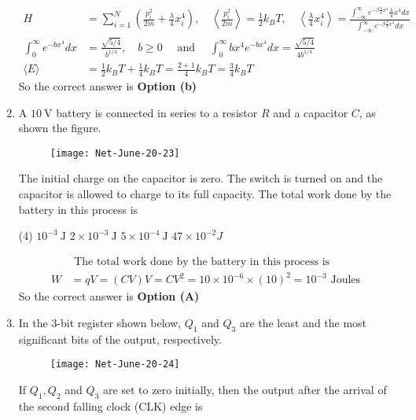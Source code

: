 \begin{enumerate}
\begin{answer}
\begin{align*}
	H&=\sum_{i=1}^{N}\left(\frac{p_{i}^{2}}{2 m}+\frac{\lambda}{4} x_{i}^{4}\right), \quad\left\langle\frac{p_{i}^{2}}{2 m}\right\rangle=\frac{1}{2} k_{B} T, \quad\left\langle\frac{\lambda}{4} x_{i}^{4}\right\rangle=\frac{\int_{-\infty}^{\infty} e^{-\beta \frac{\lambda}{4} x^{4}} \frac{\lambda}{4} x^{4} d x}{\int_{-\infty}^{\infty} e^{-\beta \frac{\lambda}{4} x^{4}} d x}\\
	\int_{0}^{\infty} e^{-b x^{4}} d x&=\frac{\sqrt{5 / 4}}{b^{1 / 4}}, \quad b \geq 0 \quad \text { and } \quad \int_{0}^{\infty} b x^{4} e^{-b x^{4}} d x=\frac{\sqrt{5 / 4}}{4 b^{1 / 4}}\\
	\langle E\rangle&=\frac{1}{2} k_{B} T+\frac{1}{4} k_{B} T=\frac{2+1}{4} k_{B} T=\frac{3}{4} k_{B} T
	\end{align*}
	So the correct answer is \textbf{Option (b)}
\end{answer}
\item A $10 \mathrm{~V}$ battery is connected in series to a resistor $R$ and a capacitor $C$, as shown the figure.
\begin{figure}[H]
	\centering
	\texttt{[image: Net-June-20-23]}
\end{figure}
The initial charge on the capacitor is zero. The switch is turned on and the capacitor is allowed to charge to its full capacity. The total work done by the battery in this process is
 \begin{tasks}(4)
	\task[\textbf{a.}]$10^{-3} \mathrm{~J}$
	\task[\textbf{b.}]$2 \times 10^{-3} \mathrm{~J}$
	\task[\textbf{c.}]$5 \times 10^{-4} \mathrm{~J}$
	\task[\textbf{d.}] $47 \times 10^{-2} J$
\end{tasks}
\begin{answer}
	\begin{align*}
&\text{ The total work done by the battery in this process is}\\
	W&=q V=(C V) V=C V^{2}=10 \times 10^{-6} \times(10)^{2}=10^{-3} \text { Joules }
	\end{align*}
		So the correct answer is \textbf{Option (A)}
\end{answer}
\item In the 3-bit register shown below, $Q_{1}$ and $Q_{3}$ are the least and the most significant bits of the output, respectively.
\begin{figure}[H]
	\centering
	\texttt{[image: Net-June-20-24]}
\end{figure}
If $Q_{1}, Q_{2}$ and $Q_{3}$ are set to zero initially, then the output after the arrival of the second falling clock (CLK) edge is

\end{enumerate}
